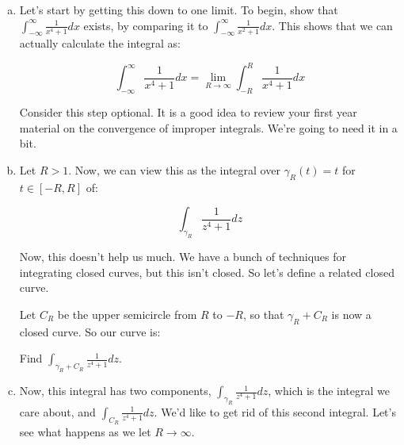 \begin{enumerate}
\begin{enumerate}[a)]

\item Let's start by getting this down to one limit. To begin, show that $\int_{-\infty}^\infty \frac{1}{x^4 + 1}dx$ exists, by comparing it to $\int_{-\infty}^\infty \frac{1}{x^2 + 1}dx$. This shows that we can actually calculate the integral as:

$$\int_{-\infty}^\infty \frac{1}{x^4 + 1}dx = \lim_{R\rightarrow \infty} \int_{-R}^R \frac{1}{x^4 + 1}dx$$

Consider this step optional. It is a good idea to review your first year material on the convergence of improper integrals. We're going to need it in a bit.

\item Let $R > 1$. Now, we can view this as the integral over $\gamma_R(t) = t$ for $t \in [-R,R]$ of:

$$\int_{\gamma_R} \frac{1}{z^4 + 1}dz$$

Now, this doesn't help us much. We have a bunch of techniques for integrating closed curves, but this isn't closed. So let's define a related closed curve.

\vspace{10pt}

Let $C_R$ be the upper semicircle from $R$ to $-R$, so that $\gamma_R + C_R$ is now a closed curve. So our curve is:

\begin{center}
\end{center}

Find $\int_{\gamma_R + C_R} \frac{1}{z^4 + 1}dz$.



\item Now, this integral has two components, $\int_{\gamma_R} \frac{1}{z^4 + 1}dz$, which is the integral we care about, and $\int_{C_R} \frac{1}{z^4 + 1}dz$. We'd like to get rid of this second integral. Let's see what happens as we let $R \rightarrow \infty$.


\end{enumerate}
\end{enumerate}
